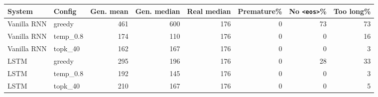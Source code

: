 \begin{tabular}{llrrrrrr}
\toprule
System & Config & Gen. mean & Gen. median & Real median & Premature\% & No \texttt{<eos>}\% & Too long\% \\
\midrule
Vanilla RNN & greedy & 461 & 600 & 176 & 0 & 73 & 73 \\
Vanilla RNN & temp\_0.8 & 174 & 110 & 176 & 0 & 0 & 16 \\
Vanilla RNN & topk\_40 & 162 & 167 & 176 & 0 & 0 & 3 \\
LSTM & greedy & 295 & 196 & 176 & 0 & 28 & 33 \\
LSTM & temp\_0.8 & 192 & 145 & 176 & 0 & 0 & 3 \\
LSTM & topk\_40 & 210 & 167 & 176 & 0 & 0 & 5 \\
\bottomrule
\end{tabular}
